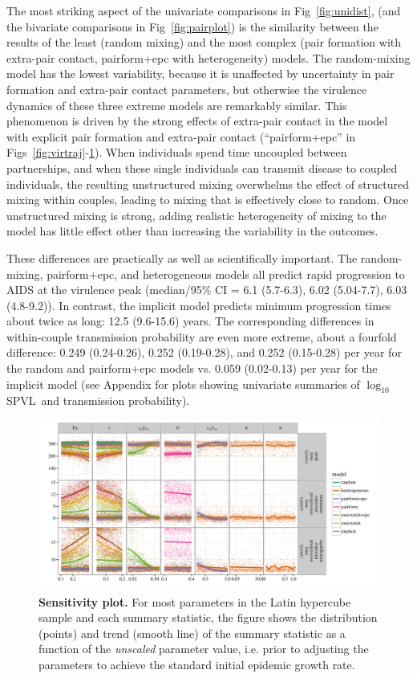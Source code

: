 \documentclass[10pt,letterpaper]{article}
\renewcommand{\figurename}{Fig}
\newcommand{\Lspvl}{$\log_{10}$ SPVL}
\begin{document}
The most striking aspect of the univariate comparisons in
\figurename~\ref{fig:unidist}, (and the bivariate comparisons in
\figurename~\ref{fig:pairplot}) is the similarity between the results of the
least (random mixing) and the most complex (pair formation with
extra-pair contact, pairform+epc with heterogeneity) models. The random-mixing model has the lowest variability, because it is unaffected by uncertainty in pair formation and extra-pair contact parameters, but otherwise the virulence
dynamics of these three extreme models are remarkably similar.
This phenomenon is driven by the strong effects of extra-pair contact in the
model with explicit pair formation and extra-pair contact 
(``pairform+epc'' in \figurename{}s~\ref{fig:virtraj}-\ref{fig:plot_sens}). When individuals spend time uncoupled between
partnerships, and when these single individuals can transmit disease
to coupled individuals, the resulting unstructured mixing overwhelms
the effect of structured mixing within couples, leading to mixing
that is effectively close to random.
Once unstructured mixing is strong, adding realistic heterogeneity
of mixing to the model has little effect other than increasing
the variability in the outcomes.

These differences are practically as well as 
scientifically important. The random-mixing, pairform+epc,
and heterogeneous models all predict rapid
progression to AIDS at the virulence peak
(median/95\% CI = 6.1 (5.7-6.3), 
6.02 (5.04-7.7), 6.03  (4.8-9.2)). 
In contrast, 
the implicit model predicts minimum progression times about twice as long:
12.5 (9.6-15.6) years. The corresponding differences in 
within-couple transmission
probability are even more extreme, about a fourfold difference:
0.249 (0.24-0.26), 0.252 (0.19-0.28), and 0.252 (0.15-0.28) per year for the 
random and pairform+epc models vs. 0.059 (0.02-0.13) per year
for the implicit model (see Appendix for 
plots showing univariate summaries
of \Lspvl\ and transmission probability).

\begin{figure}[!ht]
\includegraphics[width=\textwidth]{../figures/fig5.pdf}
\caption{{\bf Sensitivity plot.}
For most parameters in the Latin hypercube sample and each summary statistic, the figure shows the distribution (points) and trend (smooth line) of the summary statistic as a function of the \emph{unscaled} parameter value, i.e. prior to adjusting the parameters to achieve the standard initial epidemic growth rate.}
\label{fig:plot_sens}
\end{figure}
\end{document}
